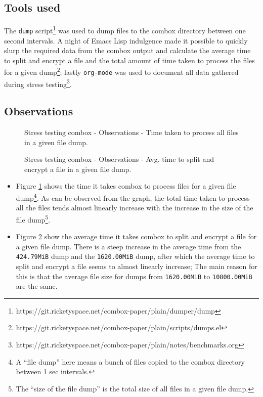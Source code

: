 \subsection{Tools used}\label{4-st-tu}

The \verb+dump+ script\footnote{https://git.ricketyspace.net/combox-paper/plain/dumper/dump} was used to dump files to
the combox directory between one second intervals. A night of Emacs
Lisp indulgence made it possible to quickly slurp the required data
from the combox output and calculate the average time to split and
encrypt a file and the total amount of time taken to process the files
for a given dump\footnote{https://git.ricketyspace.net/combox-paper/plain/scripts/dumps.el}; lastly \verb+org-mode+ was
used to document all data gathered during stress
testing\footnote{https://git.ricketyspace.net/combox-paper/plain/notes/benchmarks.org}.

\subsection{Observations}\label{4-st-o}

\begin{figure}[h]
\centering

\caption{Stress testing combox - Observations - Time taken to process
  all files in a given file dump.}
\label{fig:4-st-tt}
\end{figure}

\begin{figure}[h]
\centering

\caption{Stress testing combox - Observations - Avg. time to split and
  encrypt a file in a given file dump.}
\label{fig:4-st-atsae}
\end{figure}


\begin{itemize}
\item Figure \ref{fig:4-st-tt} shows the time it takes combox to
  process files for a given file dump\footnote{A ``file dump'' here
    means a bunch of files copied to the combox directory between 1
    sec intervals.}. As can be observed from the graph, the total time
  taken to process all the files tends almost linearly increase with
  the increase in the size of the file dump\footnote{The ``size of the
    file dump'' is the total size of all files in a given file dump.}.
\item Figure \ref{fig:4-st-atsae} show the average time it takes
  combox to split and encrypt a file for a given file dump. There is a
  steep increase in the average time from the \verb+424.79MiB+
  dump and the \verb+1620.00MiB+ dump, after which the average
  time to split and encrypt a file seems to almost linearly increase;
  The main reason for this is that the average file size for dumps
  from \verb+1620.00MiB+ to \verb+10800.00MiB+ are the same.
\end{itemize}

